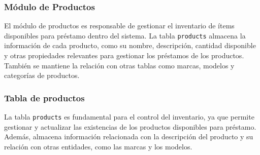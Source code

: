 \subsubsection{Módulo de Productos}

El módulo de productos es responsable de gestionar el inventario de ítems disponibles para préstamo dentro del sistema. La tabla \texttt{products} almacena la información de cada producto, como su nombre, descripción, cantidad disponible y otras propiedades relevantes para gestionar los préstamos de los productos. También se mantiene la relación con otras tablas como marcas, modelos y categorías de productos.

\subsubsection*{Tabla de productos}

La tabla \texttt{products} es fundamental para el control del inventario, ya que permite gestionar y actualizar las existencias de los productos disponibles para préstamo. Además, almacena información relacionada con la descripción del producto y su relación con otras entidades, como las marcas y los modelos.

